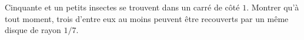 Cinquante et un petits insectes se trouvent dans un carré de côté $1$. Montrer qu'à tout moment, trois d'entre eux au moins peuvent être recouverts par un même disque de rayon $1/7$.
